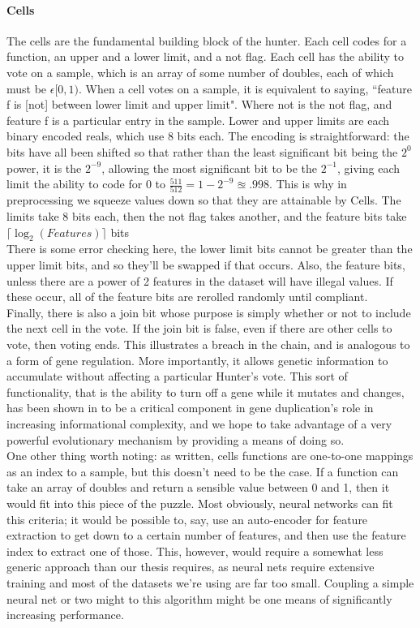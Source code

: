 \paragraph{Cells}
The cells are the fundamental building block of the hunter.  Each cell codes for a function, an upper and a lower limit, and a not flag.  Each cell has the ability to vote on a sample, which is an array of some number of doubles, each of which must be $\epsilon[0,1)$.  When a cell votes on a sample, it is equivalent to saying, ``feature f is [not] between lower limit and upper limit".  Where not is the not flag, and feature f is a particular entry in the sample.  Lower and upper limits are each binary encoded reals, which use 8 bits each.  The encoding is straightforward:  the bits have all been shifted so that rather than the least significant bit being the $2^0$ power, it is the $2^{-9}$, allowing the most significant bit to be the $2^{-1}$, giving each limit the ability to code for 0 to $\frac{511}{512}= 1-2^{-9} \approxeq .998 $.  This is why in preprocessing we squeeze values down so that they are attainable by Cells.  The limits take 8 bits each, then the not flag takes another, and the feature bits take $\lceil \log_2(Features)\rceil$ bits\\There is some error checking here, the lower limit bits cannot be greater than the upper limit bits, and so they'll be swapped if that occurs.  Also, the feature bits, unless there are a power of 2 features in the dataset will have illegal values.  If these occur, all of the feature bits are rerolled randomly until compliant.\\
Finally, there is also a join bit whose purpose is simply whether or not to include the next cell in the vote. If the join bit is false, even if there are other cells to vote, then voting ends.  This illustrates a breach in the chain, and is  analogous to a form of gene regulation.  More importantly, it allows genetic information to accumulate without affecting a particular Hunter's vote.  This sort of functionality, that is the ability to turn off a gene while it mutates and changes, has been shown in \cite{zhang_evolution_2003} to be a critical component in gene duplication's role in increasing informational complexity, and we hope to take advantage of a very powerful evolutionary mechanism by providing a means of doing so.\\
One other thing worth noting:  as written, cells functions are one-to-one mappings as an index to a sample, but this doesn't need to be the case.  If a function can take an array of doubles and return a sensible value between 0 and 1, then it would fit into this piece of the puzzle.  Most obviously, neural networks can fit this criteria; it would be possible to, say, use an auto-encoder for feature extraction to get down to a certain number of features, and then use the feature index to extract one of those.  This, however, would require a somewhat less generic approach than our thesis requires, as neural nets require extensive training and most of the datasets we're using are far too small.  Coupling a simple neural net or two might to this algorithm might be one means of significantly increasing performance. \\
